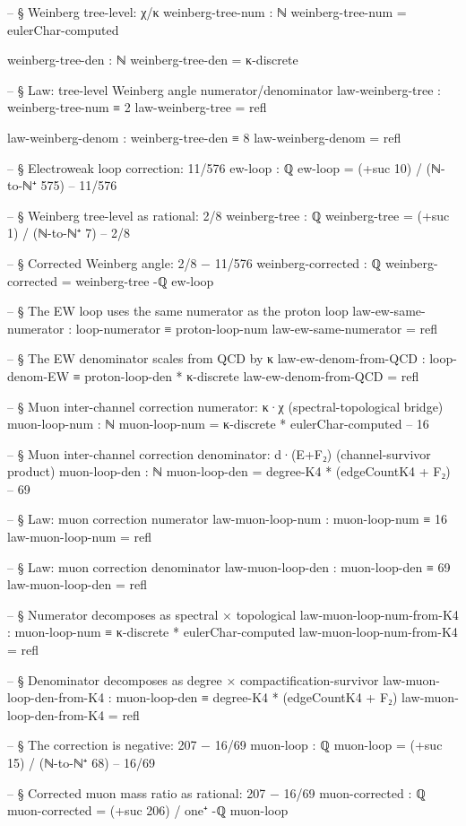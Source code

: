 \documentclass[11pt,a4paper]{book}
\begin{document}
\begin{code}
-- § Weinberg tree-level: χ/κ
weinberg-tree-num : ℕ
weinberg-tree-num = eulerChar-computed

weinberg-tree-den : ℕ
weinberg-tree-den = κ-discrete

-- § Law: tree-level Weinberg angle numerator/denominator
law-weinberg-tree : weinberg-tree-num ≡ 2
law-weinberg-tree = refl

law-weinberg-denom : weinberg-tree-den ≡ 8
law-weinberg-denom = refl

-- § Electroweak loop correction: 11/576
ew-loop : ℚ
ew-loop = (+suc 10) / (ℕ-to-ℕ⁺ 575)     -- 11/576

-- § Weinberg tree-level as rational: 2/8
weinberg-tree : ℚ
weinberg-tree = (+suc 1) / (ℕ-to-ℕ⁺ 7)  -- 2/8

-- § Corrected Weinberg angle: 2/8 − 11/576
weinberg-corrected : ℚ
weinberg-corrected = weinberg-tree -ℚ ew-loop

-- § The EW loop uses the same numerator as the proton loop
law-ew-same-numerator : loop-numerator ≡ proton-loop-num
law-ew-same-numerator = refl

-- § The EW denominator scales from QCD by κ
law-ew-denom-from-QCD : loop-denom-EW ≡ proton-loop-den * κ-discrete
law-ew-denom-from-QCD = refl

-- § Muon inter-channel correction numerator: κ·χ (spectral-topological bridge)
muon-loop-num : ℕ
muon-loop-num = κ-discrete * eulerChar-computed   -- 16

-- § Muon inter-channel correction denominator: d·(E+F₂) (channel-survivor product)
muon-loop-den : ℕ
muon-loop-den = degree-K4 * (edgeCountK4 + F₂)   -- 69

-- § Law: muon correction numerator
law-muon-loop-num : muon-loop-num ≡ 16
law-muon-loop-num = refl

-- § Law: muon correction denominator
law-muon-loop-den : muon-loop-den ≡ 69
law-muon-loop-den = refl

-- § Numerator decomposes as spectral × topological
law-muon-loop-num-from-K4 : muon-loop-num ≡ κ-discrete * eulerChar-computed
law-muon-loop-num-from-K4 = refl

-- § Denominator decomposes as degree × compactification-survivor
law-muon-loop-den-from-K4 : muon-loop-den ≡ degree-K4 * (edgeCountK4 + F₂)
law-muon-loop-den-from-K4 = refl

-- § The correction is negative: 207 − 16/69
muon-loop : ℚ
muon-loop = (+suc 15) / (ℕ-to-ℕ⁺ 68)    -- 16/69

-- § Corrected muon mass ratio as rational: 207 − 16/69
muon-corrected : ℚ
muon-corrected = (+suc 206) / one⁺ -ℚ muon-loop


\end{code}
\end{document}
